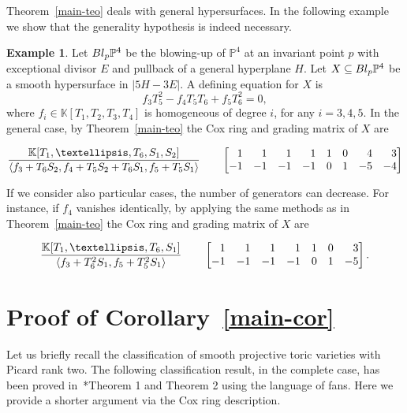 \documentclass{amsart}
\theoremstyle{definition}
\newtheorem{example}[theorem]{Example}
\theoremstyle{remark}
\begin{document}
Theorem~\ref{main-teo} deals with general
hypersurfaces. In the following example we
show that the generality hypothesis is indeed
necessary.

\begin{example}
Let ${\rm Bl}_p\mathbb P^4$ be the blowing-up
of $\mathbb P^4$ at an invariant point $p$
with exceptional divisor $E$ and pullback
of a general hyperplane $H$.
Let $X\subseteq {\rm Bl}_p\mathbb P^4$ be
a smooth hypersurface in $|5H-3E|$.
A defining equation for $X$ is
\[
 f_3T_5^2 - f_4T_5T_6 + f_5T_6^2 = 0,
\]
where $f_i\in\mathbb K[T_1,T_2,T_3,T_4]$
is homogeneous of degree $i$, for any $i=3,4,5$.
In the general case, by Theorem~\ref{main-teo} the
Cox ring and grading matrix of $X$ are

{\small
\[
 \frac{\mathbb K[T_1,\dots,T_6,S_1,S_2]}
 {\langle f_3+T_6S_2, f_4+T_5S_2+T_6S_1, f_5 + T_5S_1\rangle}
 \qquad
\begin{bmatrix}
  \hfill 1 & \hfill 1 & \hfill 1 & \hfill 1 & \hfill 1 & \hfill 0 & \hfill 4 & \hfill 3\\
  \hfill -1 & \hfill -1 & \hfill -1 & \hfill -1 & \hfill 0 & \hfill 1 & \hfill -5 & \hfill -4
\end{bmatrix}
\]
}

If we consider also particular cases, the number of
generators can decrease. For instance,
if $f_4$ vanishes identically,
by applying the same methods as in
Theorem~\ref{main-teo} the Cox ring and grading
matrix of $X$ are

{\small
\[
 \frac{\mathbb K[T_1,\dots,T_6,S_1]}
 {\langle f_3+T_6^2S_1, f_5 + T_5^2S_1\rangle}
 \qquad
\begin{bmatrix}
  \hfill 1 & \hfill 1 & \hfill 1 & \hfill 1 & \hfill 1 & \hfill 0 & \hfill 3 \\
  \hfill -1 & \hfill -1 & \hfill -1 & \hfill -1 & \hfill 0 & \hfill 1 & \hfill -5
\end{bmatrix}.
\]
}

\end{example}

\section{Proof of Corollary~\ref{main-cor}}
\label{sec:proof2}
Let us briefly recall
the classification of smooth projective
toric varieties with Picard rank two.
The following classification result, in the
complete case,
has been proved in~\cite{kl}*{Theorem 1
and Theorem 2} using the language
of fans. Here we provide
a shorter argument via the Cox ring
description.
\end{document}

